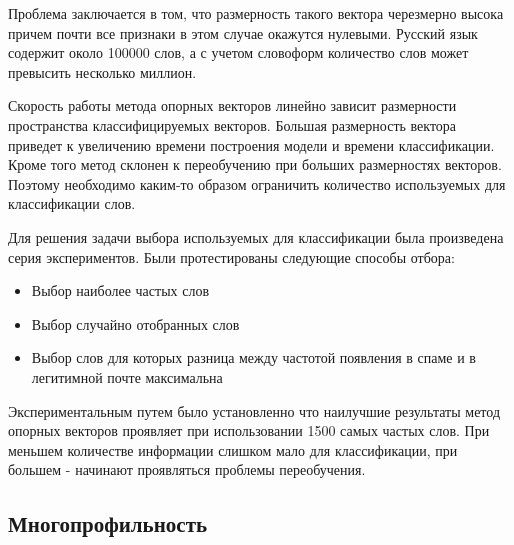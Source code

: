 Проблема заключается в том, что размерность такого вектора черезмерно высока причем
почти все признаки в этом случае окажутся нулевыми. Русский язык содержит около 100000 слов, а с
учетом словоформ количество слов может превысить несколько миллион.

Скорость работы метода опорных векторов линейно зависит размерности пространства классифицируемых векторов.
Большая размерность вектора приведет к увеличению времени построения модели и времени классификации.
Кроме того метод склонен к переобучению при больших размерностях векторов. Поэтому необходимо каким-то образом ограничить количество используемых для классификации слов.

Для решения задачи выбора используемых для классификации была произведена серия экспериментов.
Были протестированы следующие способы отбора:
\begin{itemize}
\item Выбор наиболее частых слов
\item Выбор случайно отобранных слов
\item Выбор слов для которых разница между частотой появления в спаме и в легитимной почте максимальна
\end{itemize}

Экспериментальным путем было установленно что наилучшие результаты метод опорных векторов проявляет при использовании 1500 самых частых слов. При меньшем количестве информации слишком мало для классификации, при большем - начинают проявляться проблемы переобучения.


\subsection{Многопрофильность}
